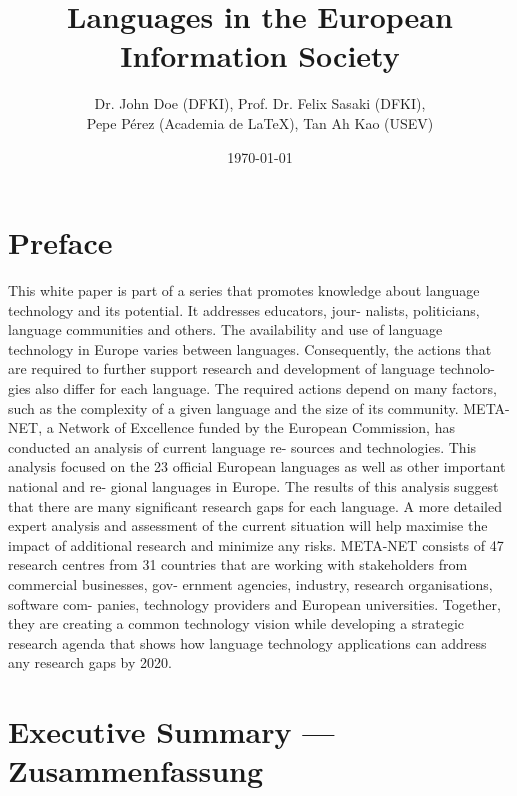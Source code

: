 \documentclass[]{../metanetpaper}
\title{Languages in the European Information Society}
\date{\today}
\author{Dr. John Doe (DFKI), Prof. Dr. Felix Sasaki (DFKI),\\
        Pepe Pérez (Academia de \LaTeX), Tan Ah Kao (USEV)}
\begin{document}
	\maketitle

	\section*{Preface}
	This white paper is part of a series that promotes knowledge about
language technology and its potential. It addresses educators, jour-
nalists, politicians, language communities and others.
The availability and use of language technology in Europe varies
between languages. Consequently, the actions that are required to
further support research and development of language technolo-
gies also differ for each language. The required actions depend on
many factors, such as the complexity of a given language and the
size of its community.
META-NET, a Network of Excellence funded by the European
Commission, has conducted an analysis of current language re-
sources and technologies. This analysis focused on the 23 official
European languages as well as other important national and re-
gional languages in Europe. The results of this analysis suggest that
there are many significant research gaps for each language. A more
detailed expert analysis and assessment of the current situation
will help maximise the impact of additional research and minimize
any risks.
META-NET consists of 47 research centres from 31 countries that
are working with stakeholders from commercial businesses, gov-
ernment agencies, industry, research organisations, software com-
panies, technology providers and European universities. Together,
they are creating a common technology vision while developing a
strategic research agenda that shows how language technology
applications can address any research gaps by 2020.

\clearpage

	\tableofcontents

	\clearpage
	\section{Executive Summary --- Zusammenfassung}
	
\end{document}
